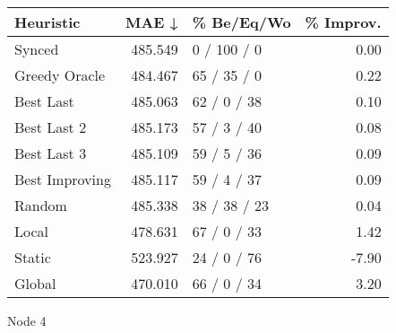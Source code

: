 \begin{tabular}{lrlr}
\toprule
\textbf{Heuristic} & \textbf{MAE ↓} & \textbf{\% Be/Eq/Wo} & \textbf{\% Improv.} \\
\midrule
            Synced &        485.549 &          0 / 100 / 0 &                0.00 \\
     Greedy Oracle &        484.467 &          65 / 35 / 0 &                0.22 \\
         Best Last &        485.063 &          62 / 0 / 38 &                0.10 \\
       Best Last 2 &        485.173 &          57 / 3 / 40 &                0.08 \\
       Best Last 3 &        485.109 &          59 / 5 / 36 &                0.09 \\
    Best Improving &        485.117 &          59 / 4 / 37 &                0.09 \\
            Random &        485.338 &         38 / 38 / 23 &                0.04 \\
             Local &        478.631 &          67 / 0 / 33 &                1.42 \\
            Static &        523.927 &          24 / 0 / 76 &               -7.90 \\
            Global &        470.010 &          66 / 0 / 34 &                3.20 \\
\bottomrule
\end{tabular}
\caption{Node 4}
\label{tab:iid_lr01_le1_bs2_4}

